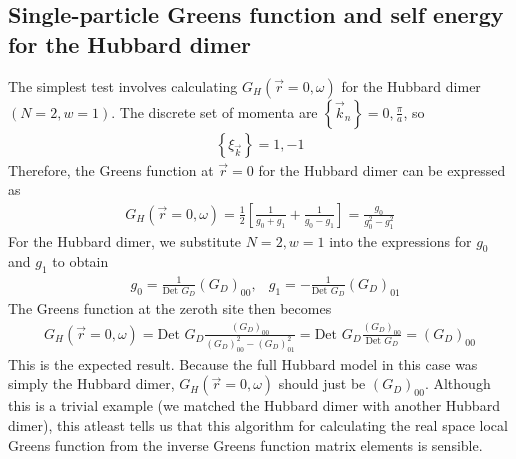 \documentclass[12pt]{article}
\numberwithin{equation}{section}
\begin{document}
\subsection{Single-particle Greens function and self energy for the Hubbard dimer}
The simplest test involves calculating \(G_H(\vec r = 0, \omega)\) for the Hubbard dimer \(\left(N = 2, w = 1 \right)\). The discrete set of momenta are \(\left\{ \vec k_n \right\} = 0, \frac{\pi}{a}\), so
\begin{equation}\begin{aligned}
	\left\{\xi_{\vec k}\right\} = 1, -1
\end{aligned}\end{equation}
Therefore, the Greens function at $\vec r=0$ for the Hubbard dimer can be expressed as
\begin{equation}\begin{aligned}
	G_H(\vec r = 0, \omega) = \frac{1}{2}\left[\frac{1}{g_0 + g_1} + \frac{1}{g_0 - g_1}\right]  = \frac{g_0}{g_0^2 - g_1^2}
\end{aligned}\end{equation}
For the Hubbard dimer, we substitute $N=2, w=1$ into the expressions for $g_{0}$ and $g_{1}$ to obtain
\begin{equation}\begin{aligned}
	&g_0 = \frac{1}{\text{Det }G_D}\left( G_D \right)_{00}, &g_1 = -\frac{1}{\text{Det }G_D}\left( G_D \right)_{01}
\end{aligned}\end{equation}
The Greens function at the zeroth site then becomes
\begin{equation}\begin{aligned}
	G_H(\vec r = 0, \omega) = \text{Det }G_D\frac{\left(G_D\right)_{00}}{\left(G_D\right)_{00}^2 - \left(G_D\right)_{01}^2} = \text{Det }G_D\frac{\left(G_D\right)_{00}}{\text{Det }G_D} = \left(G_D\right)_{00}
\end{aligned}\end{equation}
This is the expected result. Because the full Hubbard model in this case was simply the Hubbard dimer, \(G_H(\vec r = 0, \omega)\) should just be \(\left(G_D\right)_{00}\). Although this is a trivial example (we matched the Hubbard dimer with another Hubbard dimer), this atleast tells us that this algorithm for calculating the real space local Greens function from the inverse Greens function matrix elements is sensible.
\end{document}
